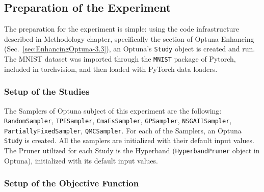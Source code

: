 % 
% 
% 

\subsection{Preparation of the Experiment}

The preparation for the experiment is simple: using the code infrastructure described in Methodology chapter, specifically the section of Optuna Enhancing (Sec.~\ref{sec:EnhancingOptuna-3.3}), an Optuna's \texttt{Study} object is created and run.
\\[0.3cm]The MNIST dataset was imported through the \texttt{MNIST} package of Pytorch, included in torchvision, and then loaded with PyTorch data loaders.

\subsubsection{Setup of the Studies}

The Samplers of Optuna subject of this experiment are the following: \texttt{RandomSampler}, \texttt{TPESampler}, \texttt{CmaEsSampler}, \texttt{GPSampler}, \texttt{NSGAIISampler}, \texttt{PartiallyFixedSampler}, \texttt{QMCSampler}.
For each of the Samplers, an Optuna \texttt{Study} is created. All the samplers are initialized with their default input values.
\\[0.3cm]The Pruner utilized for each Study is the Hyperband (\texttt{HyperbandPruner} object in Optuna), initialized with its default input values.

\subsubsection{Setup of the Objective Function}

